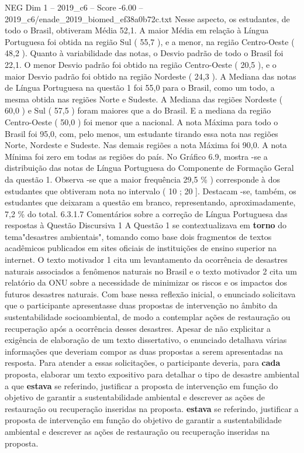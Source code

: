 \begin{textsample}{NEG Dim 1 – 2019\_c6 – Score -6.00 – 2019\_c6/enade\_2019\_biomed\_ef38a0b72c.txt}
Nesse aspecto, os estudantes, de todo o Brasil, obtiveram Média 52,1.
A maior Média em relação à Língua Portuguesa foi obtida na região Sul ( 55,7 ), e a menor, na região Centro-Oeste ( 48,2 ).
Quanto à variabilidade das notas, o Desvio padrão de todo o Brasil foi 22,1.
O menor Desvio padrão foi obtido na região Centro-Oeste ( 20,5 ), e o maior Desvio padrão foi obtido na região Nordeste ( 24,3 ).
A Mediana das notas de Língua Portuguesa na questão 1 foi 55,0 para o Brasil, como um todo, a mesma obtida nas regiões Norte e Sudeste.
A Mediana das regiões Nordeste ( 60,0 ) e Sul ( 57,5 ) foram maiores que a do Brasil.
E a mediana da região Centro-Oeste ( 50,0 ) foi menor que a nacional.
A nota Máxima para todo o Brasil foi 95,0, com, pelo menos, um estudante tirando essa nota nas regiões Norte, Nordeste e Sudeste.
Nas demais regiões a nota Máxima foi 90,0.
A nota Mínima foi zero em todas as regiões do país.
No Gráfico 6.9, mostra -se a distribuição das notas de Língua Portuguesa do Componente de Formação Geral da questão 1.
Observa -se que a maior frequência 29,5 \% ) corresponde à dos estudantes que obtiveram nota no intervalo ( 10 ; 20 ].
Destacam -se, também, os estudantes que deixaram a questão em branco, representando, aproximadamente, 7,2 \% do total. 6.3.1.7 Comentários sobre a correção de Língua Portuguesa das respostas à Questão Discursiva 1 A Questão 1 se contextualizava em \textbf{torno} do tema"desastres ambientais", tomando como base dois fragmentos de textos acadêmicos publicados em sites oficiais de instituições de ensino superior na internet.
O texto motivador 1 cita um levantamento da ocorrência de desastres naturais associados a fenômenos naturais no Brasil e o texto motivador 2 cita um relatório da ONU sobre a necessidade de minimizar os riscos e os impactos dos futuros desastres naturais.
Com base nessa reflexão inicial, o enunciado solicitava que o participante apresentasse duas propostas de intervenção no âmbito da sustentabilidade socioambiental, de modo a contemplar ações de restauração ou recuperação após a ocorrência desses desastres.
Apesar de não explicitar a exigência de elaboração de um texto dissertativo, o enunciado detalhava várias informações que deveriam compor as duas propostas a serem apresentadas na resposta.
Para atender a essas solicitações, o participante deveria, para \textbf{cada} proposta, elaborar um texto expositivo para detalhar o tipo de desastre ambiental a que \textbf{estava} se referindo, justificar a proposta de intervenção em função do objetivo de garantir a sustentabilidade ambiental e descrever as ações de restauração ou recuperação inseridas na proposta. \textbf{estava} se referindo, justificar a proposta de intervenção em função do objetivo de garantir a sustentabilidade ambiental e descrever as ações de restauração ou recuperação inseridas na proposta.

\end{textsample}
